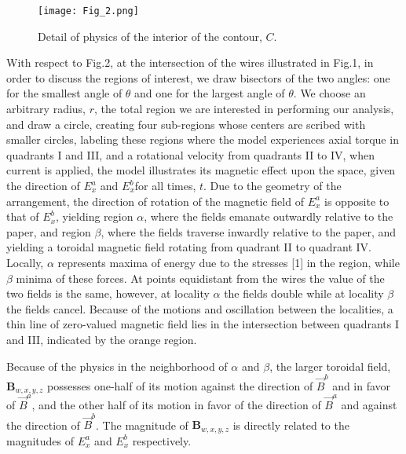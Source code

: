 \documentclass[]{article}
\begin{document}
\begin{figure}
  \texttt{[image: Fig\_2.png]}
  \caption{Detail of physics of the interior of the contour, $C$.}\label{fig:fig2}
\end{figure}

With respect to Fig.2, at the intersection of the wires illustrated in Fig.1, in order to discuss the regions of interest, we draw bisectors of the two angles: one for the smallest angle of $\theta$ and one for the largest angle of $\theta$. We choose an arbitrary radius, $r$, the total region we are interested in performing our analysis, and draw a circle, creating four sub-regions whose centers are scribed with smaller circles, labeling these regions where the model experiences axial torque in quadrants I and III, and a rotational velocity from quadrants II to IV, when current is applied, the model illustrates its magnetic effect upon the space, given the direction of $E_{x}^{a}$ and $E_{x}^{b}$for all times, $t$. Due to the geometry of the arrangement, the direction of rotation of the magnetic field of $E_{x}^{a}$ is opposite to that of $E_{x}^{b}$, yielding region $\alpha$, where the fields emanate outwardly relative to the paper, and region $\beta$, where the fields traverse inwardly relative to the paper, and yielding a toroidal magnetic field rotating from quadrant II to quadrant IV. Locally, $\alpha$ represents maxima of energy due to the stresses [1] in the region, while $\beta$ minima of these forces. At points equidistant from the wires the value of the two fields is the same, however, at locality $\alpha$ the fields double while at locality $\beta$ the fields cancel. Because of the motions and oscillation between the localities, a thin line of zero-valued magnetic field lies in the intersection between quadrants I and III, indicated by the orange region.

Because of the physics in the neighborhood of $\alpha$ and $\beta$, the larger toroidal field, ${{\mathbf{B}}_{w,x,y,z}}$ possesses one-half of its motion against the direction of ${{\vec{B}}^{b}}$ and in favor of ${{\vec{B}}^{a}}$, and the other half of its motion in favor of the direction of ${{\vec{B}}^{a}}$ and against the direction of ${{\vec{B}}^{b}}$. The magnitude of ${{\mathbf{B}}_{w,x,y,z}}$ is directly related to the magnitudes of $E_{x}^{a}$ and $E_{x}^{b}$ respectively.

\end{document}
